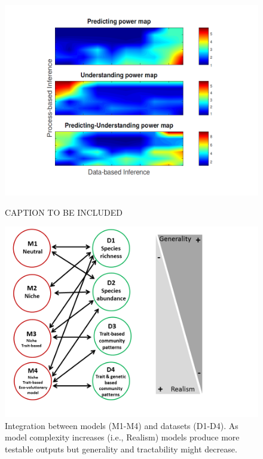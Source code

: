 \documentclass[12pt,a4paper]{article}
\begin{document}
\begin{figure}[H]
	 \centering
	 \includegraphics[width = 1\textwidth]{Fig1.png}
	 \\
	 \caption{CAPTION TO BE INCLUDED}
      \end{figure}

\begin{figure}[H]
	\centering
	\includegraphics[width = 1\textwidth]{Fig2.png}
	\caption{Integration between models (M1-M4) and datasets (D1-D4). As model complexity increases (i.e., Realism) models produce more testable outputs but generality and tractability might decrease.}
\end{figure}

\newpage
\end{document}
